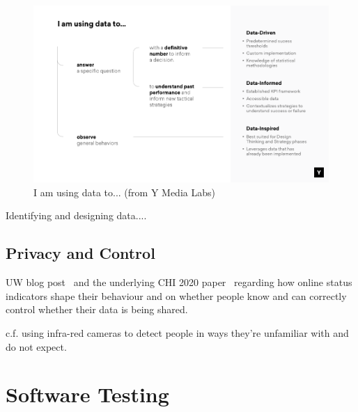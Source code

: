 \begin{figure}[ht]
    \centering
    \includegraphics[width=15cm]{images/data-informed-graphic-ymedia-labs.png}
    \caption{I am using data to... (from Y Media Labs)~\cite{amplitude_are_you_data_driven}}
    \label{fig:i_am_using_data_to}
\end{figure}

Identifying and designing data....


\subsection{Privacy and Control}

UW blog post~\cite{mcquate_I_saw_you_were_online} and the underlying CHI 2020 paper~\cite{cobb2020_ux_s_with_online_status_indicators} regarding how online status indicators shape their behaviour and on whether people know and can correctly control whether their data is being shared.

c.f. using infra-red cameras to detect people in ways they're unfamiliar with and do not expect. 

\section{Software Testing}

